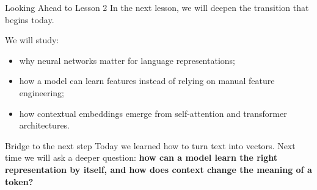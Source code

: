 \documentclass[aspectratio=169]{beamer}
\begin{document}
\begin{frame}{Looking Ahead to Lesson 2}
In the next lesson, we will deepen the transition that begins today.

\vspace{0.15cm}
We will study:
\begin{itemize}
    \item why neural networks matter for language representations;
    \item how a model can learn features instead of relying on manual feature engineering;
    \item how contextual embeddings emerge from self-attention and transformer architectures.
\end{itemize}

\vspace{0.18cm}
\begin{alertblock}{Bridge to the next step}
Today we learned how to turn text into vectors. Next time we will ask a deeper question: \textbf{how can a model learn the right representation by itself, and how does context change the meaning of a token?}
\end{alertblock}
\end{frame}
%
\end{document}
